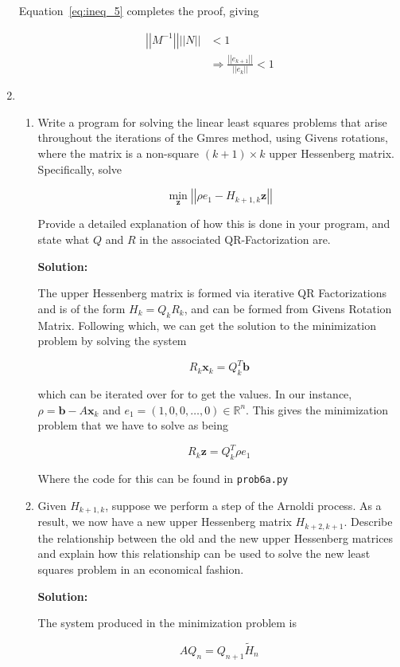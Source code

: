 \documentclass[12pt]{article}
\newcommand{\norm}[1]{\left|\left| #1 \right|\right|}
\newcommand{\vect}{\mathbf}
\newcommand{\inv}[1]{ #1^{-1}}
\begin{document}
\begin{enumerate}
Equation~\ref{eq:ineq_5} completes the proof, giving

\begin{align*}
  \norm{\inv{M}} \norm{N} &< 1\\
  &\Rightarrow \frac{\norm{e_{k+1}}}{\norm{e_{k}}} < 1
\end{align*}

\item \
\begin{enumerate}
\item Write a program for solving the linear least squares problems that arise
throughout the iterations of the {\sc Gmres} method, using Givens rotations,
where the matrix is a non-square $(k+1) \times k$ upper Hessenberg matrix. Specifically,
solve

\[
\min_{\vect{z}} \norm{\rho e_{1} - H_{k+1,k}\mathbf{z}}
\]

Provide a detailed explanation of how this is done in your program, and state
what $Q$ and $R$ in the associated QR-Factorization are.

{\bf Solution:}

The upper Hessenberg matrix is formed via iterative QR Factorizations and is
of the form $H_{k} = Q_{k} R_{k}$, and can be formed from Givens Rotation Matrix.
Following which, we can get the solution to the minimization problem by solving
the system

\[
    R_{k} \vect{x}_{k} = Q_{k}^{T}\vect{b}
\]

which can be iterated over for to get the values. In our instance, $\rho = \vect{b} - A\vect{x}_{k}$
and $e_{1} = \left(1, 0, 0, \ldots, 0 \right)\in \mathbb{R}^{n}$. This gives the minimization problem
that we have to solve as being

\[
    R_{k}\vect{z} = Q_{k}^{T}\rho e_{1}
\]

Where the code for this can be found in {\tt prob6a.py}

\item Given $H_{k+1,k}$, suppose we perform a step of the Arnoldi process. As a
result, we now have a new upper Hessenberg matrix $H_{k+2,k+1}$. Describe the
relationship between the old and the new upper Hessenberg matrices and explain
how this relationship can be used to solve the new least squares problem in an
economical fashion.

{\bf Solution:}

The system produced in the minimization problem is

\[
  AQ_{n} = Q_{n+1} \widetilde{H}_{n}
\]


\end{enumerate}
\end{enumerate}
\end{document}

